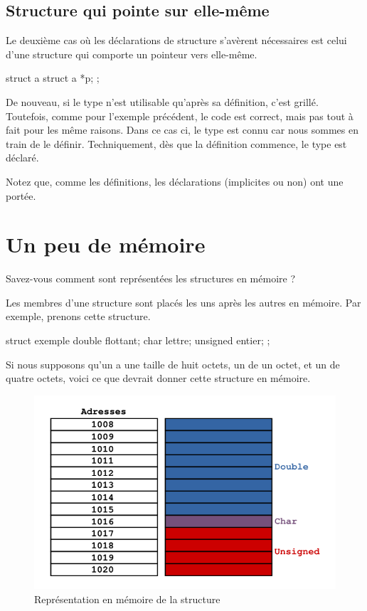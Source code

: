 \subsection{Structure qui pointe sur elle-même}
\label{structure-qui-pointe-sur-elle-meme}

Le deuxième cas où les déclarations de structure s'avèrent nécessaires
est celui d'une structure qui comporte un pointeur vers elle-même.

\begin{C}
struct a {
    struct a *p;
};
\end{C}

De nouveau, si le type  n'est utilisable qu'après sa
définition, c'est grillé. Toutefois, comme pour l'exemple précédent, le
code est correct, mais pas tout à fait pour les même raisons. Dans ce
cas ci, le type  est connu car nous sommes en train de
le définir. Techniquement, dès que la définition commence, le type est
déclaré.

\begin{infobox}
Notez que, comme les définitions, les déclarations (implicites ou non)
ont une portée.
\end{infobox}

\section{Un peu de mémoire}
\label{un-peu-de-memoire}

Savez-vous comment sont représentées les structures en
mémoire ?

Les membres d'une structure sont placés les uns après les autres en
mémoire. Par exemple, prenons cette structure.

\begin{C}
 struct exemple
{
    double flottant;
    char lettre;
    unsigned entier;
};
\end{C}

Si nous supposons qu'un  a une taille de huit octets, un
 de un octet, et un  de quatre
octets, voici ce que devrait donner cette structure en mémoire.

\begin{figure}[htbp]
\centering
\includegraphics[scale=0.5]{images/structure_memoire.png}
\caption{Représentation en mémoire de la structure}
\end{figure}

